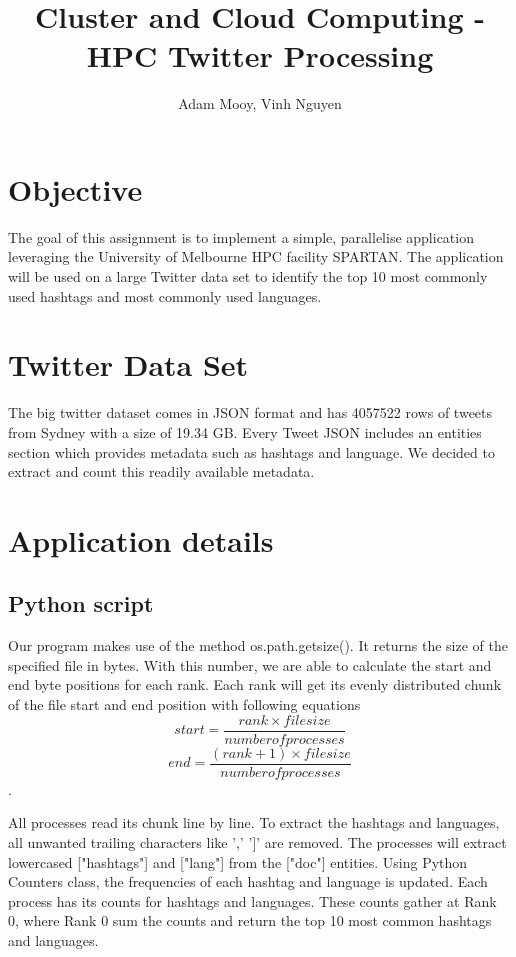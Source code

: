 \documentclass[11pt]{article}
\title{Cluster and Cloud Computing - HPC Twitter Processing}
\author{Adam Mooy, Vinh Nguyen}
\begin{document}
\maketitle

\section{Objective}

The goal of this assignment is to implement a simple, parallelise application leveraging the University of Melbourne HPC facility SPARTAN. The application will be used on a large Twitter data set to identify the top 10 most commonly used hashtags and most commonly used languages. 

\section{Twitter Data Set}
The big twitter dataset comes in JSON format and has 4057522 rows of tweets from Sydney with a size of 19.34 GB. Every Tweet JSON includes an entities section which provides metadata such as hashtags and language. We decided to extract and count this readily available metadata. 

\section{Application details}
\subsection{Python script}
Our program makes use of the method os.path.getsize(). It returns the size of the specified file in bytes. With this number, we are able to calculate the start and end byte positions for each rank.  Each rank will get its evenly distributed chunk of the file start and end position with following equations \[start =  \frac{rank \times filesize}{number of processes} \] \[end =  \frac{(rank+1) \times filesize}{number of processes} \]. 

All processes read its chunk line by line. To extract the hashtags and languages, all unwanted trailing characters like ',' ']'  are removed. The processes will extract lowercased ["hashtags"] and ["lang"] from the ["doc"] entities. Using Python Counters class, the frequencies of each hashtag and language is updated. Each process has its counts for hashtags and languages. These counts gather at Rank 0, where Rank 0 sum the counts and return the top 10 most common hashtags and languages. 
\end{document}
